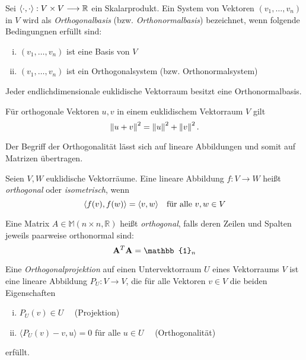 \begin{defn}
Sei $\langle \cdot, \cdot \rangle: V \times V \longrightarrow \mathbb{R}$ ein Skalarprodukt. Ein System von Vektoren $(v_1, \ldots, v_n)$ in $V$ wird als \textit{Orthogonalbasis} (bzw. \textit{Orthonormalbasis}) bezeichnet, wenn folgende Bedingungnen erfüllt sind:
\begin{enumerate}[(i)]
\item $(v_1, \ldots, v_n)$ ist eine Basis von $V$
\item $(v_1, \ldots, v_n)$ ist ein Orthogonalsystem (bzw. Orthonormalsystem)
\end{enumerate}
\end{defn}

\begin{thm}
Jeder endlichdimensionale euklidische Vektorraum besitzt eine Orthonormalbasis.
\end{thm}

\begin{thm}
\label{pythagoras}
Für orthogonale Vektoren $u,v$ in einem euklidischem Vektorraum $V$ gilt
$$\left\lVert u+v \right\rVert^2 = \left\lVert u \right\rVert^2 + \left\lVert v \right\rVert^2.$$
\end{thm}

Der Begriff der Orthogonalität lässt sich auf lineare Abbildungen und somit auf Matrizen übertragen.

\begin{defn}
Seien $V,W$ euklidische Vektorräume. Eine lineare Abbildung $f: V \longrightarrow W$ heißt \textit{orthogonal} oder \textit{isometrisch}, wenn
$$\langle f(v), f(w) \rangle = \langle v, w \rangle \quad \text{für alle } v,w \in V$$
\end{defn}

\begin{defn}
Eine Matrix $A \in \mathbb{M}(n \times n, \mathbb{R})$ heißt 		\textit{orthogonal}, falls deren Zeilen und Spalten jeweils paarweise orthonormal sind:
$$\mat A^T \mat A = \mathbb{1}_n$$
\end{defn}

\begin{defn}
Eine \textit{Orthogonalprojektion} auf einen Untervektorraum $U$ eines Vektorraums $V$ ist eine lineare Abbildung $P_U \colon V \rightarrow V$, die für alle Vektoren $v\in V$ die beiden Eigenschaften
\begin{enumerate}[(i)]
\item $P_U(v) \in U \quad$   (Projektion)
\item $\langle P_U(v) - v , u \rangle = 0$ für alle $u \in U \quad$ (Orthogonalität)
\end{enumerate}
erfüllt.
\end{defn}

